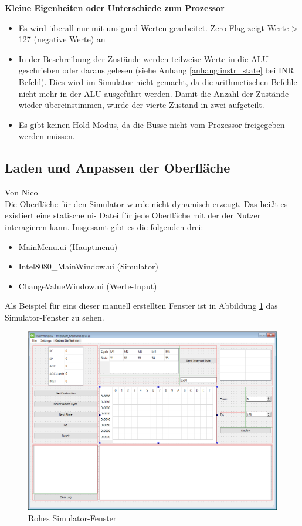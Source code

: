 \documentclass[12pt]{article}
\newcommand{\imgSpaceBefore}{\vspace{10pt}}
\begin{document}
\newpage
\noindent
\textbf{Kleine Eigenheiten oder Unterschiede zum Prozessor}

\noindent
\begin{itemize}
\item Es wird überall nur mit unsigned Werten gearbeitet. Zero-Flag zeigt Werte > 127 (negative Werte) an
\item In der Beschreibung der Zustände werden teilweise Werte in die ALU geschrieben oder daraus gelesen (siehe Anhang \ref{anhang:instr_state} bei INR Befehl). Dies wird im Simulator nicht gemacht, da die arithmetischen Befehle nicht mehr in der ALU ausgeführt werden. Damit die Anzahl der Zustände wieder übereinstimmen, wurde der vierte Zustand in zwei aufgeteilt.
\item Es gibt keinen Hold-Modus, da die Busse nicht vom Prozessor freigegeben werden müssen.
\end{itemize}

\subsection{Laden und Anpassen der Oberfläche}\label{chapter:LadenDObfl}
Von Nico\\

\noindent
Die Oberfläche für den Simulator wurde nicht dynamisch erzeugt. Das heißt es existiert eine statische \glqq ui\grqq- Datei für jede Oberfläche mit der der Nutzer interagieren kann. Insgesamt gibt es die folgenden drei:\imgSpaceBefore

\begin{itemize}
	\item MainMenu.ui (Hauptmenü)
	\item Intel8080\_MainWindow.ui (Simulator)
	\item ChangeValueWindow.ui (Werte-Input)
\end{itemize}

\noindent
Als Beispiel für eins dieser manuell erstellten Fenster ist in Abbildung \ref{fig:RawUI} das Simulator-Fenster zu sehen.\imgSpaceBefore

\begin{figure}[H]
\centering
\includegraphics[width=15cm]{bilder/RawUIFile}
\caption{Rohes Simulator-Fenster}
\label{fig:RawUI}
\end{figure}
\end{document}
